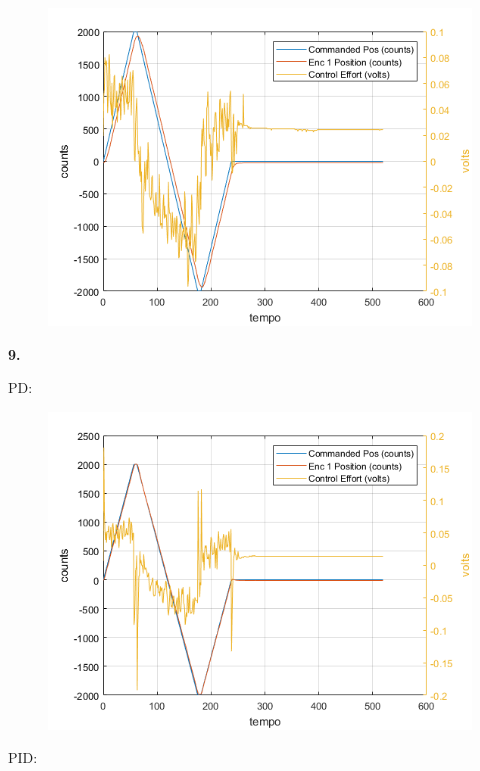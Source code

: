 \documentclass[a4paper,11pt]{article}
\begin{document}
\begin{figure}[H]
\includegraphics{q08}
\centering
\end{figure}

\textbf{9.}

PD:

\begin{figure}[H]
\includegraphics{q09-pd}
\centering
\end{figure}

PID:
\end{document}

